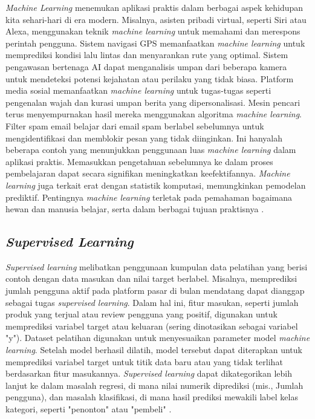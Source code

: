 \emph{Machine Learning} menemukan aplikasi praktis dalam berbagai aspek kehidupan kita sehari-hari di era modern. Misalnya, asisten pribadi virtual, seperti Siri atau Alexa, menggunakan teknik \emph{machine learning} untuk memahami dan merespons perintah pengguna. Sistem navigasi GPS memanfaatkan \emph{machine learning} untuk memprediksi kondisi lalu lintas dan menyarankan rute yang optimal. Sistem pengawasan bertenaga AI dapat menganalisis umpan dari beberapa kamera untuk mendeteksi potensi kejahatan atau perilaku yang tidak biasa. Platform media sosial memanfaatkan \emph{machine learning} untuk tugas-tugas seperti pengenalan wajah dan kurasi umpan berita yang dipersonalisasi. Mesin pencari terus menyempurnakan hasil mereka menggunakan algoritma \emph{machine learning}. Filter spam email belajar dari email spam berlabel sebelumnya untuk mengidentifikasi dan memblokir pesan yang tidak diinginkan. Ini hanyalah beberapa contoh yang menunjukkan penggunaan luas \emph{machine learning} dalam aplikasi praktis. Memasukkan pengetahuan sebelumnya ke dalam proses pembelajaran dapat secara signifikan meningkatkan keefektifannya. \emph{Machine learning} juga terkait erat dengan statistik komputasi, memungkinkan pemodelan prediktif. Pentingnya \emph{machine learning} terletak pada pemahaman bagaimana hewan dan manusia belajar, serta dalam berbagai tujuan praktisnya \parencite{Datta}.

\subsection{\emph{Supervised Learning}}
\label{subsec:supervisedlearning}

\emph{Supervised learning} melibatkan penggunaan kumpulan data pelatihan yang berisi contoh dengan data masukan dan nilai target berlabel. Misalnya, memprediksi jumlah pengguna aktif pada platform pasar di bulan mendatang dapat dianggap sebagai tugas \emph{supervised learning}. Dalam hal ini, fitur masukan, seperti jumlah produk yang terjual atau review pengguna yang positif, digunakan untuk memprediksi variabel target atau keluaran (sering dinotasikan sebagai variabel "y"). Dataset pelatihan digunakan untuk menyesuaikan parameter model \emph{machine learning}. Setelah model berhasil dilatih, model tersebut dapat diterapkan untuk memprediksi variabel target untuk titik data baru atau yang tidak terlihat berdasarkan fitur masukannya. \emph{Supervised learning} dapat dikategorikan lebih lanjut ke dalam masalah regresi, di mana nilai numerik diprediksi (mis., Jumlah pengguna), dan masalah klasifikasi, di mana hasil prediksi mewakili label kelas kategori, seperti "penonton" atau "pembeli" \parencite{Janiesch}.

